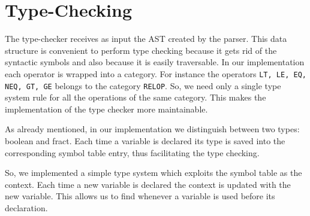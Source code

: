 \section{Type-Checking}
\label{sec:type-checking}

The type-checker receives as input the AST created by the 
parser. This data structure is convenient to perform
type checking because it gets rid of the syntactic symbols and also because it 
is easily traversable.
In our implementation each operator is wrapped into a category.
For instance the operators \verb|LT, LE, EQ, NEQ, GT, GE| belongs to the 
category \verb|RELOP|. So, we need only a single type system rule for all the
operations of the same category.
This makes the implementation of the type checker more maintainable.


As already mentioned, in our implementation we distinguish between two types:
boolean and fract. Each time a variable is declared its type is saved into the 
corresponding symbol table entry, thus facilitating the type checking.

So, we implemented a simple type system which exploits the symbol
table as the context. Each time a new variable is declared 
the context is updated with the new variable. This allows us to find whenever
a variable is used before its declaration.
